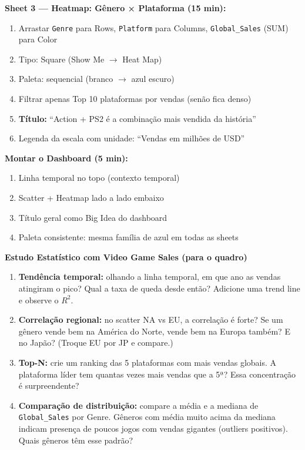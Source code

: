 \begin{SolvedBox}
\textbf{Sheet 3 — Heatmap: Gênero × Plataforma (15 min):}
\begin{enumerate}
  \item Arrastar \texttt{Genre} para Rows, \texttt{Platform} para
  Columns, \texttt{Global\_Sales} (SUM) para Color
  \item Tipo: Square (Show Me $\to$ Heat Map)
  \item Paleta: sequencial (branco $\to$ azul escuro)
  \item Filtrar apenas Top 10 plataformas por vendas (senão fica denso)
  \item \textbf{Título:} ``Action + PS2 é a combinação mais vendida da história''
  \item Legenda da escala com unidade: ``Vendas em milhões de USD''
\end{enumerate}

\textbf{Montar o Dashboard (5 min):}
\begin{enumerate}
  \item Linha temporal no topo (contexto temporal)
  \item Scatter + Heatmap lado a lado embaixo
  \item Título geral como Big Idea do dashboard
  \item Paleta consistente: mesma família de azul em todas as sheets
\end{enumerate}
\end{SolvedBox}

\begin{BoardBox}
\textbf{Estudo Estatístico com Video Game Sales (para o quadro)}

\begin{enumerate}
  \item \textbf{Tendência temporal:} olhando a linha temporal, em que
  ano as vendas atingiram o pico? Qual a taxa de queda desde então?
  Adicione uma trend line e observe o $R^2$.

  \item \textbf{Correlação regional:} no scatter NA vs EU, a
  correlação é forte? Se um gênero vende bem na América do Norte,
  vende bem na Europa também? E no Japão? (Troque EU por JP e compare.)

  \item \textbf{Top-N:} crie um ranking das 5 plataformas com mais
  vendas globais. A plataforma líder tem quantas vezes mais vendas
  que a 5ª? Essa concentração é surpreendente?

  \item \textbf{Comparação de distribuição:} compare a média e a
  mediana de \texttt{Global\_Sales} por Genre. Gêneros com média
  muito acima da mediana indicam presença de poucos jogos com
  vendas gigantes (outliers positivos). Quais gêneros têm esse padrão?
\end{enumerate}
\end{BoardBox}

